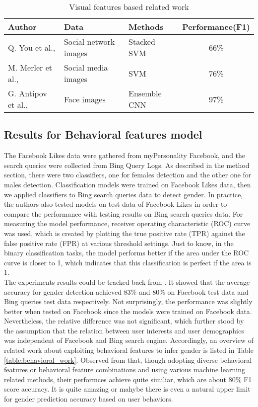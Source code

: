 \documentclass[runningheads]{llncs}
\begin{document}
	
	\begin{table}
		\centering
		\caption{Visual features based related work }
		\begin{tabular}{| l | l | l | c | }
			\hline
			Author  &  Data  & Methods & Performance(F1)\\
			\hline
			Q. You et al.,  \cite{you2014eyes} & Social network images & Stacked-SVM & 66\% \\
			M. Merler et al., \cite{merler2015you} & Social media images & SVM & 76\% \\
			G. Antipov et al.,  \cite{antipov2016minimalistic} & Face images & Ensemble CNN
			& 97\% \\
			\hline
		\end{tabular}
		\label{table:visual_work}
	\end{table}
	
	\subsection{Results for Behavioral features model}
	
	The Facebook Likes data were gathered from myPersonality Facebook, and the search queries were collected from Bing Query Logs. As described in the method section, there were two classifiers, one for females detection and the other one for males detection. Classification models were trained on Facebook Likes data, then we applied classifiers to Bing search queries data to detect gender. In practice, the authors also tested models on test data of Facebook Likes in order to compare the performance with testing results on Bing search queries data. For measuring the model performance, receiver operating characteristic (ROC) curve was used, which is created by plotting the true positive rate (TPR) against the false positive rate (FPR) at various threshold settings. Just to know, in the binary classification tasks, the model performs better if the area under the ROC curve is closer to 1, which indicates that this classification is perfect if the area is 1. \\
	
	The experiments results could be tracked back from \cite{bi2013inferring}. It showed that the average accuracy for gender detection achieved 83\% and 80\% on Facebook test data and Bing queries test data respectively. Not surprisingly, the performance was slightly better when tested on Facebook since the models were trained on Facebook data. Nevertheless, the relative difference was not significant, which further stood by the assumption that the relation between user interests and user demographics was independent of Facebook and Bing search engine. 
	Accordingly, an overview of related work about exploiting behavioral features to infer gender is listed in Table \ref{table:behavioral_work}. Observed from that, though adopting diverse behavioral features or behavioral feature combinations and using various machine learning related methods, their performces achieve quite similiar, which are about 80\% F1 score accuracy. It is quite amazing or mahybe there is even a natural upper limit for gender prediction accuracy based on user behaviors. 
	
\end{document}
